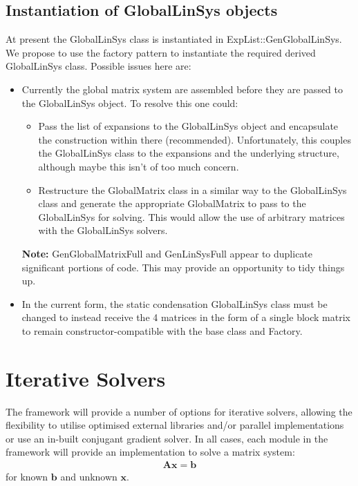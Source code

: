 \documentclass{article}
\begin{document}
\subsection{Instantiation of GlobalLinSys objects}
At present the GlobalLinSys class is instantiated in ExpList::GenGlobalLinSys.
We propose to use the factory pattern to instantiate the required derived
GlobalLinSys class. Possible issues here are:
\begin{itemize}
  \item Currently the global matrix system are assembled before they are
  passed to the GlobalLinSys object. To resolve this one could:
  \begin{itemize}
    \item Pass the list of expansions to the GlobalLinSys object and
    encapsulate the construction within there (recommended). Unfortunately,
    this couples the GlobalLinSys class to the expansions and the underlying
    structure, although maybe this isn't of too much concern.
    \item Restructure the GlobalMatrix class in a similar way to the
    GlobalLinSys class and generate the appropriate GlobalMatrix to pass to
    the GlobalLinSys for solving. This would allow the use of arbitrary
    matrices with the GlobalLinSys solvers.
  \end{itemize}
  \textbf{Note:} GenGlobalMatrixFull and GenLinSysFull appear to duplicate
  significant portions of code. This may provide an opportunity to tidy things 
  up.
  \item In the current form, the static condensation GlobalLinSys class must
  be changed to instead receive the 4 matrices in the form of a single block
  matrix to remain constructor-compatible with the base class and Factory.
\end{itemize}

\section{Iterative Solvers}
The framework will provide a number of options for iterative solvers, allowing
the flexibility to utilise optimised external libraries and/or parallel
implementations or use an in-built conjugant gradient solver. In all cases,
each module in the framework will provide an implementation to solve a 
matrix system:
\begin{align}
\bm{Ax}=\bm{b}
\end{align}
for known $\bm{b}$ and unknown $\bm{x}$.
\end{document}
